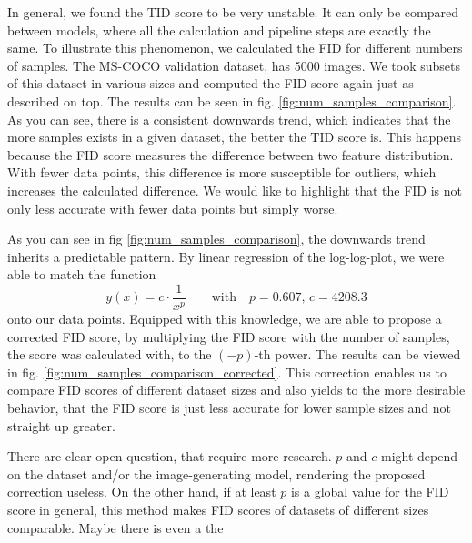 \documentclass[11pt]{article}
\begin{document}
In general, we found the TID score to be very unstable. It can only be compared between models, where all the calculation and pipeline steps are exactly the same. To illustrate this phenomenon, we calculated the FID for different numbers of samples. The MS-COCO validation dataset, has 5000 images. We took subsets of this dataset in various sizes and computed the FID score again just as described on top. The results can be seen in fig. \ref{fig:num_samples_comparison}. As you can see, there is a consistent downwards trend, which indicates that the more samples exists in a given dataset, the better the TID score is. This happens because the FID score measures the difference between two feature distribution. With fewer data points, this difference is more susceptible for outliers, which increases the calculated difference. We would like to highlight that the FID is not only less accurate with fewer data points but simply worse.

As you can see in fig \ref{fig:num_samples_comparison}, the downwards trend inherits a predictable pattern. By linear regression of the log-log-plot, we were able to match the function
$$ y(x) = c\cdot \frac{1}{x^p} \qquad\mathrm{with}\quad p = 0.607,\, c = 4208.3$$
onto our data points. Equipped with this knowledge, we are able to propose a corrected FID score, by multiplying the FID score with the number of samples, the score was calculated with, to the $(-p)$-th power. The results can be viewed in fig. \ref{fig:num_samples_comparison_corrected}. This correction enables us to compare FID scores of different dataset sizes and also yields to the more desirable behavior, that the FID score is just less accurate for lower sample sizes and not straight up greater. 

There are clear open question, that require more research. $p$ and $c$ might depend on the dataset and/or the image-generating model, rendering the proposed correction useless. On the other hand, if at least $p$ is a global value for the FID score in general, this method makes FID scores of datasets of different sizes comparable. Maybe there is even a the
\end{document}
